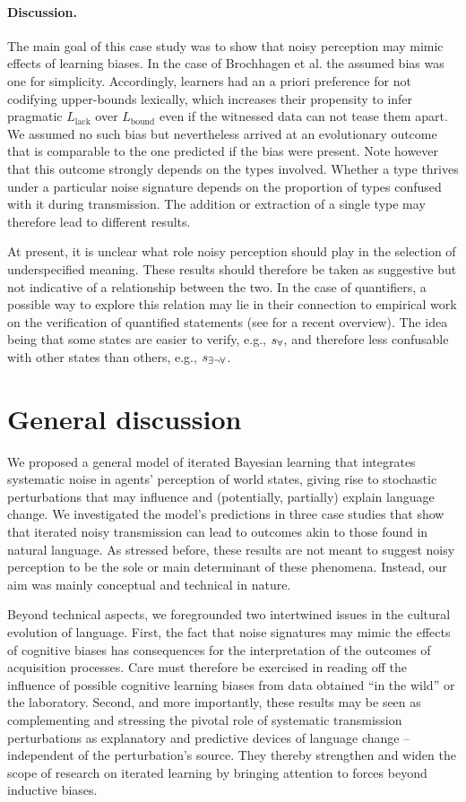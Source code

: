 \documentclass[10pt,a4paper]{article}
\newcommand{\state}{\ensuremath{s}\xspace}		%
\newcommand{\mystate}[1]{\ensuremath{\state_{\text{#1}}}\xspace} %
\newcommand{\ssome}{\mystate{\ensuremath{\exists\neg\forall}}}
\newcommand{\sall}{\mystate{\ensuremath{\forall}}}
\begin{document}
\paragraph{Discussion.} The main goal of this case study was to show that noisy perception may
mimic effects of learning biases. In the case of Brochhagen et al. the assumed bias was one
for simplicity. Accordingly, learners had an a priori preference for not codifying 
upper-bounds lexically, which increases their propensity to infer pragmatic
$L_{\text{lack}}$ over $L_{\text{bound}}$ even if the witnessed data can not tease them
apart. We assumed no such bias but nevertheless arrived at an evolutionary outcome that
is comparable to the one predicted if the bias were present. Note however that this outcome
strongly depends on the types involved. Whether a type thrives under a particular noise
signature depends on the proportion of types confused with it during transmission. The addition
or extraction of a single type may therefore lead to different results.

At present, it is unclear what role noisy perception should play in the selection of underspecified meaning. These results should therefore be taken as suggestive but not indicative of a relationship between the two. In the case of quantifiers, a possible way to explore this relation may lie in their connection to empirical work on the verification of quantified statements (see \citealt{szymanik:2016} for a recent overview). The idea being that some states are easier to verify, e.g., $\sall$, and therefore less confusable with other states than others, e.g., $\ssome$. 


\section{General discussion}
We proposed a general model of iterated Bayesian learning that integrates systematic noise in agents'
perception of world states, giving rise to stochastic perturbations that may influence and
(potentially, partially) explain language change. We investigated the model's predictions in
three case studies that show that iterated noisy transmission can lead to outcomes akin to
those found in natural language. As stressed before, these results are not meant to suggest
noisy perception to be the sole or main determinant of these phenomena. Instead, our aim was
mainly conceptual and technical in nature.

Beyond technical aspects, we foregrounded two intertwined issues in the cultural evolution of
language. First, the fact that noise signatures may mimic the effects of cognitive biases has
consequences for the interpretation of the outcomes of acquisition processes. Care must
therefore be exercised in reading off the influence of possible cognitive learning biases from
data obtained ``in the wild'' or the laboratory. Second, and more importantly, these results
may be seen as complementing and stressing the pivotal role of systematic transmission
perturbations as explanatory and predictive devices of language change -- independent of the
perturbation's source. They thereby strengthen and widen the scope of research on iterated
learning by bringing attention to forces beyond inductive biases.
\end{document}
